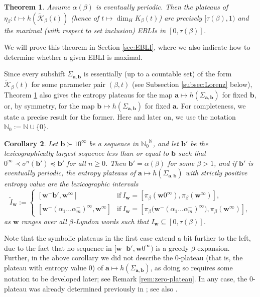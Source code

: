 \documentclass[11pt]{amsart}
\newtheorem{theorem}{Theorem}[section]
\newtheorem{corollary}[theorem]{Corollary}
\theoremstyle{definition}
\theoremstyle{remark}
\numberwithin{equation}{section}
\newcommand{\N}{\ensuremath{\mathbb{N}}}
\newcommand{\Kt}{\widetilde{\mathcal{K}}}
\renewcommand{\a}{ {\mathbf{a}}}
\renewcommand{\b}{ {\mathbf{b}}}
\newcommand{\w}{\mathbf{w}}
\newcommand{\f}{\infty}
\newcommand{\al}{\alpha}
\newcommand{\lle}{\preccurlyeq}
\renewcommand{\a}{ \mathbf{a}}
\newcommand{\si}{\sigma}
\begin{document}
\begin{theorem} \label{thm:entropy-plateaus}
Assume $\al(\beta)$ is eventually periodic. Then the plateaus of $\eta_\beta: t\mapsto h(\Kt_\beta(t))$ (hence of $t\mapsto \dim_H K_\beta(t)$) are precisely $[\tau(\beta),1)$ and the maximal (with respect to set inclusion) EBLIs in $[0,\tau(\beta)]$.
\end{theorem}

We will prove this theorem in Section \ref{sec:EBLI}, where we also indicate how to determine whether a given EBLI is maximal.

Since every subshift $\Sigma_{\a,\b}$ is essentially (up to a countable set) of the form $\Kt_\beta(t)$ for some parameter pair $(\beta,t)$ (see Subsection \ref{subsec:Lorenz} below), Theorem \ref{thm:entropy-plateaus} also gives the entropy plateaus for the map $\a\mapsto h(\Sigma_{\a,\b})$ for fixed $\b$, or, by symmetry, for the map $\b\mapsto h(\Sigma_{\a,\b})$ for fixed $\a$. For completeness, we state a precise result for the former. {Here and later on, we use the notation $\N_0:=\N\cup\{0\}$.}

\begin{corollary} \label{cor:symbolic-plateaus}
Let $\b\succ 10^\f$ be a sequence in ${\N_0}^\N$, and let $\b'$ be the lexicographically largest sequence less than or equal to $\b$ such that $0^\f\prec\si^n(\b')\lle \b'$ for all $n\geq 0$. Then $\b'=\al(\beta)$ for some $\beta{>1}$, and if $\b'$ is eventually periodic, the entropy plateaus of $\a\mapsto h(\Sigma_{\a,\b})$ with strictly positive entropy value are the lexicographic intervals
\[
\tilde{I}_\w:=\begin{cases}
[\w^-\b',\w^\f] & \mbox{if}\ I_\w=[\pi_\beta(\w0^\f),\pi_\beta(\w^\f)],\\
[\w^-(\al_1\dots\al_m^-)^\f,\w^\f] & \mbox{if}\ I_\w=[\pi_\beta\big(\w^-(\al_1\dots\al_m^-)^\f\big),\pi_\beta(\w^\f)],
\end{cases}
\]
as $\w$ ranges over all $\beta$-Lyndon words such that $I_\w\subseteq[0,\tau(\beta)]$.
\end{corollary}

Note that the symbolic plateaus in the first case extend a bit further to the left, due to the fact that no sequence in $[\w^-\b',\w0^\f)$ is a greedy $\beta$-expansion. Further, in the above corollary we did not describe the $0$-plateau (that is, the plateau with entropy value $0$) of $\a\mapsto h(\Sigma_{\a,\b})$, as doing so requires some notation to be developed later; see Remark \ref{rem:zero-plateau}. In any case, the $0$-plateau was already determined previously in \cite{Labarca-Moreira-2006}; see also \cite{Komornik-Steiner-Zou-2022}.
\end{document}
